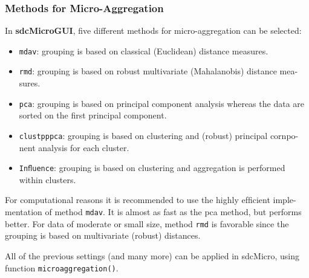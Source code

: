 \documentclass[]{article}
\begin{document}
\subsubsection*{Methods for Micro-Aggregation}
In \textbf{sdcMicroGUI}, ﬁve different methods for micro-aggregation can be selected:
\begin{itemize}
\item \texttt{mdav}: grouping is based on classical (Euclidean) distance measures.
\item \texttt{rmd}: grouping is based on robust multivariate (Mahalanobis) distance mea-
sures.
\item \texttt{pca}: grouping is based on principal component analysis whereas the data
are sorted on the ﬁrst principal component.
\item \texttt{clustpppca}: grouping is based on clustering and (robust) principal cornpo-
nent analysis for each cluster.


\item \texttt{Inﬂuence}: grouping is based on clustering and aggregation is performed
within clusters.
\end{itemize}
For computational reasons it is recommended to use the highly efﬁcient imple-
mentation of method \texttt{mdav}. It is almost as fast as the pca method, but performs
better. For data of moderate or small size, method \texttt{rmd} is favorable since the
grouping is based on multivariate (robust) distances.

All of the previous settings (and many more) can be applied in sdcMicro, using
function \texttt{microaggregation()}. 

\newpage
\end{document}
